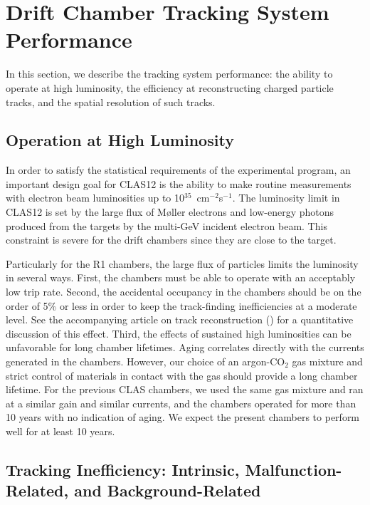 \section{Drift Chamber Tracking System Performance}

In this section, we describe the tracking system performance: the ability to operate at high luminosity,
the efficiency at reconstructing charged particle tracks, and the spatial resolution of such tracks.

\subsection{Operation at High Luminosity}

In order to satisfy the statistical requirements of the experimental program, an important design
goal for CLAS12 is the ability to make routine measurements with electron beam luminosities up to
10$^{35}$~cm$^{-2}$s$^{-1}$.  The luminosity limit in CLAS12 is 
set by the large flux of M{\o}ller electrons and low-energy photons 
produced from the targets by the multi-GeV incident electron beam.  This 
constraint is severe for the drift chambers since they are close to the 
target. 

Particularly for the R1 chambers, the large flux of particles limits the luminosity in several ways.
First, the chambers must be able to operate with an acceptably low trip rate.
Second, the accidental occupancy in the chambers should be on the order
of 5\% or less in order to keep the track-finding inefficiencies at a moderate 
level.  See the accompanying article on track reconstruction (\cite{recon-nim})
for a quantitative discussion of this effect.  Third, the effects of sustained high 
luminosities can be unfavorable for long chamber lifetimes.  Aging correlates 
directly with the currents generated in the chambers.
However, our choice of an argon-CO$_2$ gas mixture and strict control of
materials in contact with the gas should provide a long chamber lifetime.
For the previous CLAS chambers, we used the same gas mixture and ran at a
similar gain and similar currents, and the chambers operated for more than 10 years 
with no indication of aging.  We expect the present
chambers to perform well for at least 10 years.

\subsection{Tracking Inefficiency: Intrinsic, Malfunction-Related, and Background-Related}

